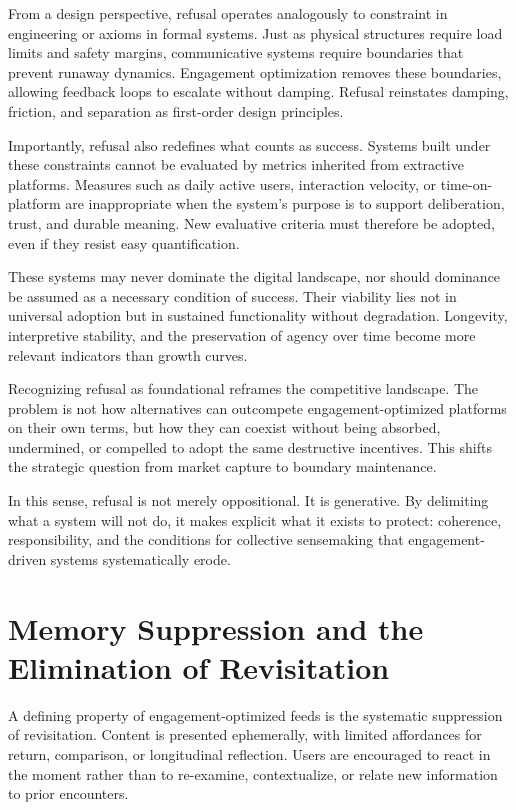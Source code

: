 \documentclass[12pt]{article}
\begin{document}
From a design perspective, refusal operates analogously to constraint in engineering or axioms in formal systems. Just as physical structures require load limits and safety margins, communicative systems require boundaries that prevent runaway dynamics. Engagement optimization removes these boundaries, allowing feedback loops to escalate without damping. Refusal reinstates damping, friction, and separation as first-order design principles.

Importantly, refusal also redefines what counts as success. Systems built under these constraints cannot be evaluated by metrics inherited from extractive platforms. Measures such as daily active users, interaction velocity, or time-on-platform are inappropriate when the system’s purpose is to support deliberation, trust, and durable meaning. New evaluative criteria must therefore be adopted, even if they resist easy quantification.

These systems may never dominate the digital landscape, nor should dominance be assumed as a necessary condition of success. Their viability lies not in universal adoption but in sustained functionality without degradation. Longevity, interpretive stability, and the preservation of agency over time become more relevant indicators than growth curves.

Recognizing refusal as foundational reframes the competitive landscape. The problem is not how alternatives can outcompete engagement-optimized platforms on their own terms, but how they can coexist without being absorbed, undermined, or compelled to adopt the same destructive incentives. This shifts the strategic question from market capture to boundary maintenance.

In this sense, refusal is not merely oppositional. It is generative. By delimiting what a system will not do, it makes explicit what it exists to protect: coherence, responsibility, and the conditions for collective sensemaking that engagement-driven systems systematically erode.

\section{Memory Suppression and the Elimination of Revisitation}

A defining property of engagement-optimized feeds is the systematic suppression of revisitation. Content is presented ephemerally, with limited affordances for return, comparison, or longitudinal reflection. Users are encouraged to react in the moment rather than to re-examine, contextualize, or relate new information to prior encounters.
\end{document}
